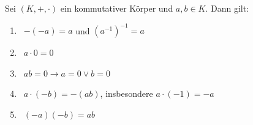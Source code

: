 Sei $(K, +, \cdot)$ ein kommutativer Körper und $a, b \in K$. Dann gilt:
\begin{enumerate}[label="",leftmargin=0pt]
    \item {} \, $-(-a) = a$ und $(a^{-1})^{-1} = a$
    \item {} \, $a \cdot 0 = 0$
    \item {} \, $ab = 0 \rightarrow a = 0 \lor b = 0$
    \item {} \, $a \cdot (-b) = -(ab)$, insbesondere $a \cdot (-1) = -a$
    \item {} \, $(-a)(-b) = ab$
\end{enumerate}
